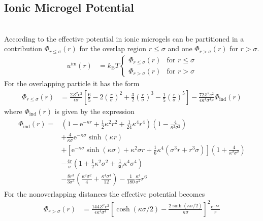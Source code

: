 \subsection{Ionic Microgel Potential}
~\\

According to \cite{Likos2011} the effective potential in ionic microgels can be partitioned in a contribution
$\Phi_{r \leq \sigma}(r)$ for the overlap region $r \leq \sigma$ and one $\Phi_{r > \sigma}(r)$ for $r>\sigma$.
\begin{align}
u^\text{im}(r) &= k_\text{B} T
\begin{cases}
\Phi_{r\leq\sigma}(r)   & \mbox{for } r \leq \sigma \\
\Phi_{r>\sigma}(r)      & \mbox{for } r > \sigma
\end{cases}
\end{align}
For the overlapping particle it has the form
\begin{align}
\Phi_{r\leq\sigma}(r) &= \frac{2Z^2\text{e}^2}{\epsilon\sigma}
                         \left[\frac{6}{5}-2\left(\frac{r}{\sigma}\right)^2
                                          +\frac{3}{2}\left(\frac{r}{\sigma}\right)^3
                                          -\frac{1}{5}\left(\frac{r}{\sigma}\right)^5
                         \right]
                        - \frac{72 Z^2e^2}{\epsilon\kappa^4\sigma^4r}\Phi_\text{ind}(r)
\end{align}
where $\Phi_\text{ind}(r)$ is given by the expression
\begin{align}
\begin{split}
  \Phi_\text{ind}(r) =&  \left(1-\text{e}^{-\kappa r}+\frac{1}{2}\kappa^2r^2+\frac{1}{24}\kappa^4r^4\right)
                        \left(1-\frac{4}{\kappa^2\sigma^2}\right) \\
                     & +\frac{4}{\kappa\sigma}\text{e}^{-\kappa\sigma}\sinh\left(\kappa r\right)\\
                     & +\left[\text{e}^{-\kappa\sigma}\sinh\left(\kappa\sigma\right)
                                    +\kappa^2\sigma r
                                    +\frac{1}{6}\kappa^4\left(\sigma^3 r + r^3 \sigma \right)
                        \right] \left(1+\frac{4}{\kappa^2\sigma^2}\right)\\
                     & -\frac{4r}{\sigma} \left(1+\frac{1}{2}\kappa^2\sigma^2+\frac{1}{30}\kappa^4\sigma^4\right) \\
                     & -\frac{8r^3}{3\sigma^3}\left(\frac{\kappa^2\sigma^2}{4}+\frac{\kappa^4\sigma^4}{12}\right)
                       -\frac{1}{180}\frac{\kappa^4}{\sigma^2} r^6
\end{split}
\end{align}
For the nonoverlapping distances the effective potential becomes
\begin{align}
\Phi_{r>\sigma}(r) &= \frac{144Z^2e^2}{\epsilon\kappa^4\sigma^4}
                      \left[\cosh\left(\kappa\sigma/2\right)-\frac{2\sinh\left(\kappa\sigma/2\right)}{\kappa\sigma}\right]^2
                      \frac{\text{e}^{-\kappa r}}{r}
\end{align}

